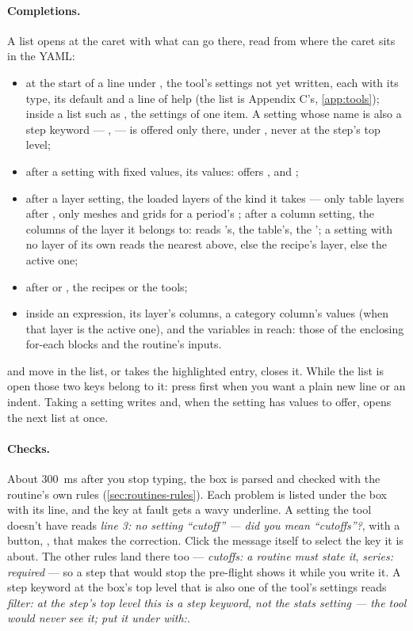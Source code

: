 \paragraph{Completions.} A list opens at the caret with what can go there, read from where the caret sits in the YAML:
\begin{itemize}
\item at the start of a line under , the tool's settings not yet written, each with its type, its default and a line of help (the list is Appendix C's, \cref{app:tools}); inside a list such as , the settings of one item. A setting whose name is also a step keyword — ,  — is offered only there, under , never at the step's top level;
\item after a setting with fixed values, its values:  offers ,  and ;
\item after a layer setting, the loaded layers of the kind it takes — only table layers after , only meshes and grids for a period's ; after a column setting, the columns of the layer it belongs to:  reads 's,  the  table's,  the '; a setting with no layer of its own reads the nearest  above, else the recipe's layer, else the active one;
\item after  or , the recipes or the tools;
\item inside an expression, its layer's columns, a category column's values (when that layer is the active one), and the \code{\$} variables in reach: those of the enclosing for-each blocks and the routine's inputs.
\end{itemize}
 and  move in the list,  or  takes the highlighted entry,  closes it. While the list is open those two keys belong to it: press  first when you want a plain new line or an indent. Taking a setting writes  and, when the setting has values to offer, opens the next list at once.

\paragraph{Checks.} About 300~ms after you stop typing, the box is parsed and checked with the routine's own rules (\cref{sec:routines-rules}). Each problem is listed under the box with its line, and the key at fault gets a wavy underline. A setting the tool doesn't have reads \emph{line 3: no setting “cutoff” — did you mean “cutoffs”?}, with a button, , that makes the correction. Click the message itself to select the key it is about. The other rules land there too — \emph{cutoffs: a routine must state it}, \emph{series: required} — so a step that would stop the pre-flight shows it while you write it. A step keyword at the box's top level that is also one of the tool's settings reads \emph{filter: at the step's top level this is a step keyword, not the stats setting — the tool would never see it; put it under with:}.

